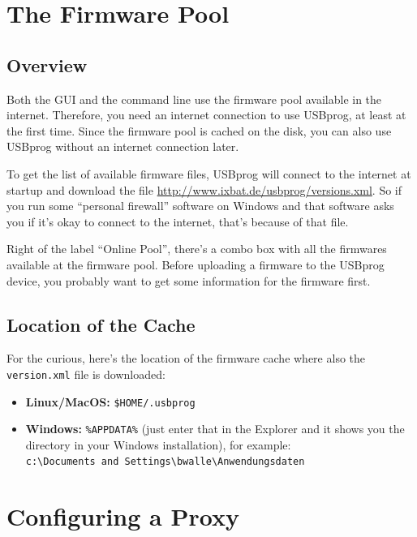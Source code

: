 \documentclass[bibtotoc,UKenglish,halfparskip,oneside,DIV12]{scrreprt}
\begin{document}
\section{The Firmware Pool}

\subsection{Overview}
\label{sec:firmwarepool_overview}

Both the GUI and the command line use the firmware pool available in the internet. Therefore, you
need an internet connection to use USBprog, at least at the first time. Since the firmware pool is
cached on the disk, you can also use USBprog without an internet connection later.

To get the list of available firmware files, USBprog will connect to the internet at startup and
download the file \url{http://www.ixbat.de/usbprog/versions.xml}. So if you run some ``personal
firewall'' software on Windows and that software asks you if it's okay to connect to the internet,
that's because of that file.

Right of the label ``Online Pool'', there's a combo box with all the firmwares available at the
firmware pool. Before uploading a firmware to the USBprog device, you probably want to get some
information for the firmware first.

\subsection{Location of the Cache}
\label{sec:cachelocation}

For the curious, here's the location of the firmware cache where also the \texttt{version.xml} file
is downloaded:

\begin{itemize}
  \item \textbf{Linux/MacOS:} \texttt{\$HOME/.usbprog}
  \item \textbf{Windows:} \texttt{\%APPDATA\%} (just enter that in the Explorer and it shows you
    the directory in your Windows installation), for example: \\
    \texttt{c:\textbackslash{}Documents and Settings\textbackslash{}bwalle\textbackslash{}Anwendungsdaten}
\end{itemize}

\section{Configuring a Proxy}
\end{document}
